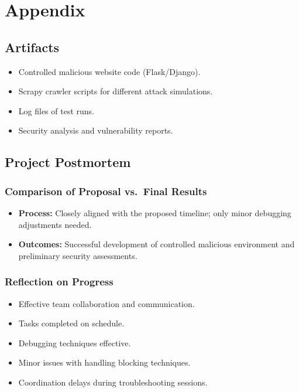 \section{Appendix}

\subsection{Artifacts}
\begin{itemize}[topsep=2pt,itemsep=2pt]
  \item Controlled malicious website code (Flask/Django).
  \item Scrapy crawler scripts for different attack simulations.
  \item Log files of test runs.
  \item Security analysis and vulnerability reports.
\end{itemize}


\subsection{Project Postmortem}

\subsubsection*{Comparison of Proposal vs.\ Final Results}
\begin{itemize}[topsep=2pt,itemsep=2pt]
  \item \textbf{Process:} Closely aligned with the proposed timeline; only minor debugging adjustments needed.
  \item \textbf{Outcomes:} Successful development of controlled malicious environment and preliminary security assessments.
\end{itemize}

\subsubsection*{Reflection on Progress}
\begin{description}[leftmargin=1cm,style=nextline,itemsep=2pt]
  \item[Going Well:]  
    \begin{itemize}[topsep=0pt,itemsep=2pt]
      \item Effective team collaboration and communication.
      \item Tasks completed on schedule.
      \item Debugging techniques effective.
    \end{itemize}
  \item[Challenges:]  
    \begin{itemize}[topsep=0pt,itemsep=2pt]
      \item Minor issues with handling blocking techniques.
      \item Coordination delays during troubleshooting sessions.
    \end{itemize}
\end{description}

